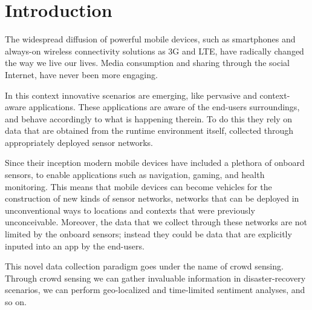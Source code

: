 \section{Introduction}
\label{sec:intro}

The widespread diffusion of powerful mobile devices, such as smartphones and always-on wireless connectivity solutions as 3G and LTE, have radically changed the way we live our lives. Media consumption and sharing through the social Internet, have never been more engaging.

In this context innovative scenarios are emerging, like pervasive and context-aware applications. These applications are aware of the end-users surroundings, and behave accordingly to what is happening therein. To do this they rely on data that are obtained from the runtime environment itself, collected through appropriately deployed sensor networks. 

Since their inception modern mobile devices have included a plethora of onboard sensors, to enable applications such as navigation, gaming, and health monitoring. This means that mobile devices can become vehicles for the construction of new kinds of sensor networks, networks that can be deployed in unconventional ways to locations and contexts that were previously unconceivable. Moreover, the data that we collect through these networks are not limited by the onboard sensors; instead they could be data that are explicitly inputed into an app by the end-users. 

This novel data collection paradigm goes under the name of crowd sensing. Through crowd sensing we can gather invaluable information in disaster-recovery scenarios, we can perform geo-localized and time-limited sentiment analyses, and so on.

